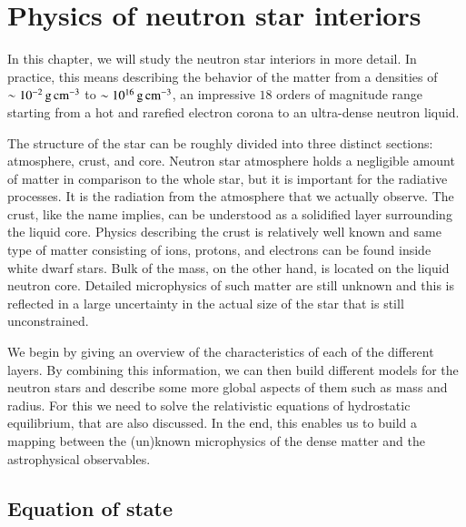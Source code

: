\chapter{Physics of neutron star interiors} 
In this chapter, we will study the neutron star interiors in more detail.
In practice, this means describing the behavior of the matter from a densities of $\sim 10^{-2} \, \mathrm{g}\,\mathrm{cm}^{-3}$ to $\sim 10^{16} \, \mathrm{g}\,\mathrm{cm}^{-3}$, an impressive $18$ orders of magnitude range starting from a hot and rarefied electron corona to an ultra-dense neutron liquid.

The structure of the star can be roughly divided into three distinct sections: atmosphere, crust, and core.
Neutron star atmosphere holds a negligible amount of matter in comparison to the whole star, but it is important for the radiative processes.
It is the radiation from the atmosphere that we actually observe.
The crust, like the name implies, can be understood as a solidified layer surrounding the liquid core.
Physics describing the crust is relatively well known and same type of matter consisting of ions, protons, and electrons can be found inside white dwarf stars.
Bulk of the mass, on the other hand, is located on the liquid neutron core.
Detailed microphysics of such matter are still unknown and this is reflected in a large uncertainty in the actual size of the star that is still unconstrained.

We begin by giving an overview of the characteristics of each of the different layers.
By combining this information, we can then build different models for the neutron stars and describe some more global aspects of them such as mass and radius.
For this we need to solve the relativistic equations of hydrostatic equilibrium, that are also discussed.
In the end, this enables us to build a mapping between the (un)known microphysics of the dense matter and the astrophysical observables.


\section{Equation of state}
%
%
%
%

